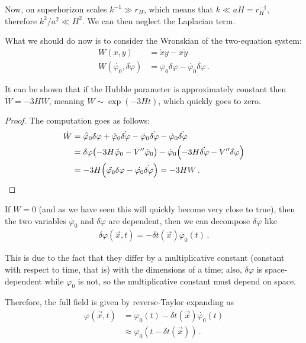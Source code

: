 \documentclass[main.tex]{subfiles}
\begin{document}
Now, on superhorizon scales \(k^{-1} \gg r_H\), which means that \(k \ll aH = r_H^{-1}\), therefore \(k^2 / a^2 \ll H^2\). 
We can then neglect the Laplacian term. 

What we should do now is to consider the Wronskian of the two-equation system:
%
\begin{align}
W (x, y) &= \dot{x} y - x \dot{y}  \\
W(\dot{\varphi_0}, \delta \varphi ) &= \ddot{\varphi_0} \delta \varphi - \dot{\varphi_0} \dot{ \delta \varphi}
\,.
\end{align}

\begin{claim}
It can be shown that if the Hubble parameter is approximately constant then \(\dot{W} = - 3 HW\), meaning \(W \sim \exp(- 3 H t)\), which quickly goes to zero.
\end{claim}

\begin{proof}
The computation goes as follows: 
%
\begin{align}
\dot{W} &= \dot{\ddot{\varphi}}_0 \delta \varphi + \ddot{\varphi}_0 \dot{ \delta \varphi} - \ddot{\varphi}_0 \dot{\delta \varphi } - \dot{\varphi}_0 \ddot{\delta \varphi }  \\
&= \delta \varphi \qty(- 3H \ddot{\varphi}_0 - V'' \dot{\varphi}_0 ) - \dot{\varphi}_0 \qty(- 3H \dot{\delta \varphi } - V'' \delta \varphi )  \\
&= - 3H \qty(\ddot{\varphi_0} \delta \varphi - \dot{\varphi_0} \dot{ \delta \varphi}) = -3HW
\,.
\end{align}
\end{proof}

If \(W = 0\) (and as we have seen this will quickly become very close to true), then the two variables \(\dot{\varphi_0} \) and \(\delta \varphi \) are dependent, then we can decompose \(\delta \varphi \) like 
%
\begin{align}
\delta \varphi (\vec{x}, t) = - \delta t (\vec{x}) \dot{\varphi_0}(t)
\,.
\end{align}

This is due to the fact that they differ by a multiplicative constant (constant with respect to time, that is) with the dimensions of a time; also, \(\delta \varphi \) is space-dependent while \(\varphi_0\) is not, so the multiplicative constant must depend on space. 

Therefore, the full field is given by reverse-Taylor expanding as 
%
\begin{align}
\varphi (\vec{x}, t) &= \varphi_0 (t) - \delta t(\vec{x}) \dot{\varphi_0}(t)  \\
&\approx \varphi_0 (t - \delta t(\vec{x}))
\,.
\end{align}
\end{document}
